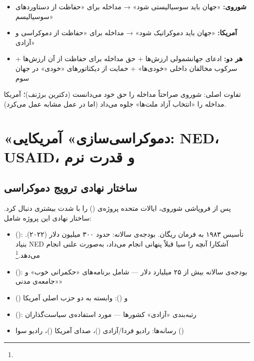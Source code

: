 \begin{tcolorbox}[wavebox, title={تقارن‌های ایدئولوژیک: شوروی و آمریکا}]
\begin{itemize}
\item \textbf{شوروی:} «جهان باید سوسیالیستی شود» → مداخله برای «حفاظت از دستاوردهای سوسیالیسم»
\item \textbf{آمریکا:} «جهان باید دموکراتیک شود» → مداخله برای «حفاظت از دموکراسی و آزادی»
\item \textbf{هر دو:} ادعای جهانشمولی ارزش‌ها + حق مداخله برای حفاظت از آن ارزش‌ها + سرکوب مخالفان داخلی «خودی‌ها» + حمایت از دیکتاتورهای «خودی» در جهان سوم
\end{itemize}
تفاوت اصلی: شوروی صراحتاً مداخله را حق خود می‌دانست (دکترین برژنف)؛ آمریکا مداخله را «انتخاب آزاد ملت‌ها» جلوه می‌داد (اما در عمل مشابه عمل می‌کرد).
\end{tcolorbox}


\section{«دموکراسی‌سازی» آمریکایی: NED، USAID، و قدرت نرم}
\label{sec:ch13-democracy-promotion}

\subsection{ساختار نهادی ترویج دموکراسی}
\label{subsec:ch13-ned-usaid}

پس از فروپاشی شوروی، ایالات متحده پروژه‌ی  () را با شدت بیشتری دنبال کرد. ساختار نهادی این پروژه شامل:

\begin{tcolorbox}[defbox, title={نهادهای اصلی ترویج دموکراسی آمریکایی}]
\begin{itemize}
\item {} (): تأسیس ۱۹۸۳ به فرمان ریگان. بودجه‌ی سالانه: حدود ۳۰۰ میلیون دلار (۲۰۲۲). بنیاد NED آشکارا آنچه را سیا قبلاً پنهانی انجام می‌داد، به‌صورت علنی انجام می‌دهد.\footnote{}
\item {} (): بودجه‌ی سالانه بیش از ۲۵ میلیارد دلار — شامل برنامه‌های «حکمرانی خوب» و «جامعه‌ی مدنی»
\item {} () و  (): وابسته به دو حزب اصلی آمریکا
\item {} (): رتبه‌بندی «آزادی» کشورها — مورد استفاده‌ی سیاست‌گذاران
\item رسانه‌ها: رادیو فردا/آزادی ()، صدای آمریکا ()، رادیو سوا ()
\end{itemize}
\end{tcolorbox}

